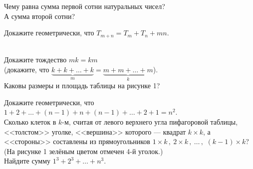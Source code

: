 \documentclass[12pt,a4paper]{article}
\begin{document}
 Чему равна сумма первой сотни натуральных чисел?\\
 А сумма второй сотни?

 Докажите геометрически, что $T_{m+n}=T_m+T_n+mn$.

 \\
 Докажите тождество $mk=km$\\ ( докажите, что $\underbrace{k+k+\ldots+k}_m = \underbrace{m+m+\ldots+m}_k$).\\
 Каковы размеры и площадь таблицы на рисунке 1?



 Докажите геометрически, что $1+2+\dots+(n-1)+n+(n-1)+\dots+2+1=n^2$.\\
Сколько клеток в $k$-м, считая от левого верхнего угла
пифагоровой таблицы, <<толстом>> уголке,
<<вершина>> которого --- квадрат $k\times k$, а <<стороны>>
составлены из прямоугольников
$1\times k\,,\ 2\times k\,,\ \ldots\,,$ $(k-1)\times k$\/? (На рисунке 1 зелёным цветом отмечен 4-й уголок.)\\
 Найдите сумму $1^3+2^3+\ldots+n^3$.
\end{document}
